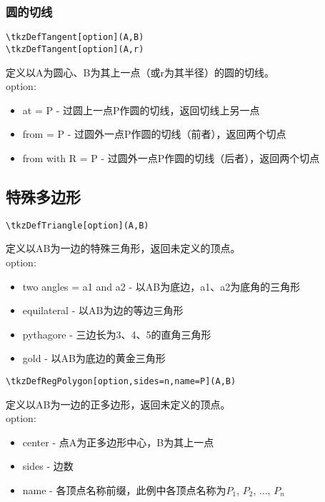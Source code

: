 \documentclass[UTF8]{ctexart}
\begin{document}
\subsubsection{圆的切线}
\begin{lstlisting}
\tkzDefTangent[option](A,B)
\tkzDefTangent[option](A,r)
\end{lstlisting}
定义以A为圆心、B为其上一点（或r为其半径）的圆的切线。\\
option:
\begin{itemize}
    \item at = P - 过圆上一点P作圆的切线，返回切线上另一点
    \item from = P - 过圆外一点P作圆的切线（前者），返回两个切点
    \item from with R = P - 过圆外一点P作圆的切线（后者），返回两个切点
\end{itemize}
\subsection{特殊多边形}
\begin{lstlisting}
\tkzDefTriangle[option](A,B)
\end{lstlisting}
定义以AB为一边的特殊三角形，返回未定义的顶点。\\
option:
\begin{itemize}
    \item two angles = a1 and a2 - 以AB为底边，a1、a2为底角的三角形
    \item equilateral - 以AB为边的等边三角形
    \item pythagore - 三边长为3、4、5的直角三角形
    \item gold - 以AB为底边的黄金三角形
\end{itemize}
\begin{lstlisting}
\tkzDefRegPolygon[option,sides=n,name=P](A,B)
\end{lstlisting}
定义以AB为一边的正多边形，返回未定义的顶点。\\
option:
\begin{itemize}
    \item center - 点A为正多边形中心，B为其上一点
    \item sides - 边数
    \item name - 各顶点名称前缀，此例中各顶点名称为$P_1$, $P_2$, ..., $P_n$
\end{itemize}
\end{document}
